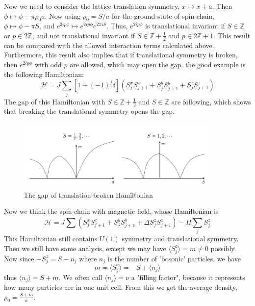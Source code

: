 Now we need to consider the lattice translation symmetry, $x\mapsto x+a$. Then $\phi\mapsto \phi-\pi\rho_0 a$. Now using $\rho_0=S/a$ for the ground state of spin chain, $\phi\mapsto \phi-\pi S$, and $e^{2ip\phi}\mapsto e^{2ip\phi}e^{2\pi i S}$. Thus, $e^{2ip\phi}$ is translational invariant if $S\in \mathbb{Z}$ or $p\in 2\mathbb{Z}$, and not translational invariant if $S\in\mathbb{Z}+\frac{1}{2}$ and $p\in 2\mathbb{Z}+1$. This result can be compared with the allowed interaction terms calculated above. Furthermore, this result also implies that if translational symmetry is broken, then $e^{2ip\phi}$ with odd $p$ are allowed, which may open the gap. the good example is the following Hamiltonian:
\begin{equation}
\mathcal{H}=J\sum_j \left[1+(-1)^j\delta\right](S_j^x S_{j+1}^x+S_j^y S_{j+1}^y+S_j^z S_{j+1}^z)
\end{equation}
The gap of this Hamiltonian with $S\in \mathbb{Z}+\frac{1}{2}$ and $S\in\mathbb{Z}$ are following, which shows that breaking the translational symmetry opens the gap.
\begin{figure}[h!]
\center
\includegraphics[width=0.9\textwidth]{graph_resize.pdf}
\caption{The gap of translation-broken Hamiltonian}
\end{figure}

Now we think the spin chain with magnetic field, whose Hamiltonian is
\begin{equation}
\mathcal{H}=J\sum(S_j^x S_{j+1}^x +S_j^y S_{j+1}^y + \Delta S_j^z S_{j+1}^z)-H\sum_j S_j^z
\end{equation}
This Hamiltonian still contains $U(1)$ symmetry and translational symmetry. Then we still have same analysis, except we may have $\langle S_j^z\rangle=m\neq 0$ possibly. Now since $-S_j^z=S-n_j$ where $n_j$ is the number of 'bosonic' particles, we have
\begin{equation}
m=\langle S_j^z\rangle=-S+\langle n_j\rangle
\end{equation}
thus $\langle n_j\rangle=S+m$. We often call $\langle n_j\rangle=\nu$ a "filling factor", because it represents how many particles are in one unit cell. From this we get the average density, $\rho_0=\frac{S+m}{a}$.

